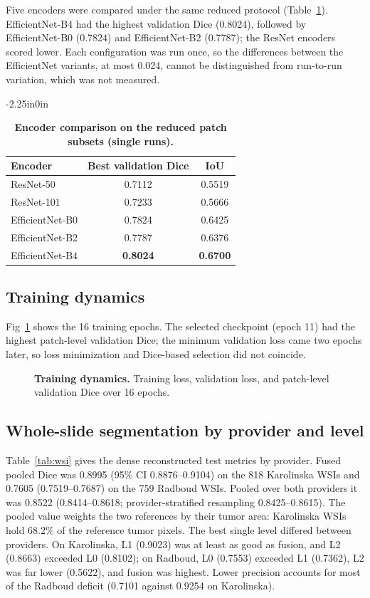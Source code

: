 \documentclass[10pt,letterpaper]{article}
\begin{document}
Five encoders were compared under the same reduced protocol (Table~\ref{tab:enc}). EfficientNet-B4 had the highest validation Dice (0.8024), followed by EfficientNet-B0 (0.7824) and EfficientNet-B2 (0.7787); the ResNet encoders scored lower. Each configuration was run once, so the differences between the EfficientNet variants, at most 0.024, cannot be distinguished from run-to-run variation, which was not measured.

\begin{table}[H]\begin{adjustwidth}{-2.25in}{0in}\centering
\caption{\textbf{Encoder comparison on the reduced patch subsets (single runs).}}
\begin{tabular}{lcc}\toprule Encoder & Best validation Dice & IoU\\\midrule
ResNet-50 & 0.7112 & 0.5519\\
ResNet-101 & 0.7233 & 0.5666\\
EfficientNet-B0 & 0.7824 & 0.6425\\
EfficientNet-B2 & 0.7787 & 0.6376\\
EfficientNet-B4 & \textbf{0.8024} & \textbf{0.6700}\\
\bottomrule
\end{tabular}\label{tab:enc}\end{adjustwidth}\end{table}

\subsection*{Training dynamics}
Fig~\ref{fig:train} shows the 16 training epochs. The selected checkpoint (epoch 11) had the highest patch-level validation Dice; the minimum validation loss came two epochs later, so loss minimization and Dice-based selection did not coincide.

\begin{figure}[H]
\centering
\caption{\textbf{Training dynamics.} Training loss, validation loss, and patch-level validation Dice over 16 epochs.}
\label{fig:train}
\end{figure}

\subsection*{Whole-slide segmentation by provider and level}
Table~\ref{tab:wsi} gives the dense reconstructed test metrics by provider. Fused pooled Dice was 0.8995 (95\% CI 0.8876--0.9104) on the 818 Karolinska WSIs and 0.7605 (0.7519--0.7687) on the 759 Radboud WSIs. Pooled over both providers it was 0.8522 (0.8414--0.8618; provider-stratified resampling 0.8425--0.8615). The pooled value weights the two references by their tumor area: Karolinska WSIs hold 68.2\% of the reference tumor pixels. The best single level differed between providers. On Karolinska, L1 (0.9023) was at least as good as fusion, and L2 (0.8663) exceeded L0 (0.8102); on Radboud, L0 (0.7553) exceeded L1 (0.7362), L2 was far lower (0.5622), and fusion was highest. Lower precision accounts for most of the Radboud deficit (0.7101 against 0.9254 on Karolinska).
\end{document}

